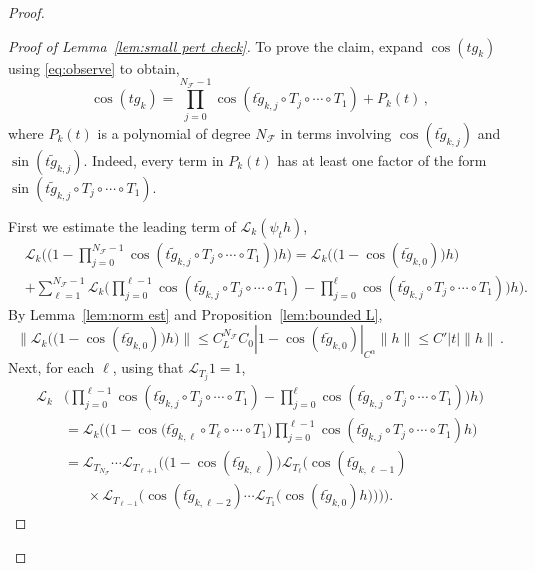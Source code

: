 \documentclass{amsart}
\numberwithin{equation}{section}
\newcommand\cF{{\mathcal F}}
\newcommand\cL{{\mathcal L}}
\begin{document}
\begin{proof}
\begin{proof}[Proof of Lemma~\ref{lem:small pert check}]
To prove the claim, expand $\cos(t g_k)$ using \eqref{eq:observe} to obtain,
\begin{equation}
\label{eq:cos expand}
\cos(t g_k) = \prod_{j=0}^{N_\cF-1} \cos (t \tilde g_{k,j} \circ T_j \circ \cdots \circ T_1) + P_k(t) \, ,
\end{equation} 
where $P_k(t)$ is a polynomial of degree $N_\cF$ in terms involving $\cos(t \tilde g_{k,j})$ and 
$\sin(t \tilde g_{k,j})$.  Indeed, every term in $P_k(t)$ has at least one factor of the form
$\sin(t \tilde g_{k,j} \circ T_j \circ \cdots \circ T_1)$.

First we estimate the leading term of $\cL_k(\psi_t h)$,
\begin{equation}
\label{eq:telescope}
\begin{split}
&\cL_k  \Big( \Big(1 - \prod_{j=0}^{N_\cF-1} \cos (t \tilde g_{k,j} \circ T_j \circ \cdots \circ T_1) \Big)h \Big)
=  \cL_k \big( \big( 1 - \cos(t \tilde g_{k,0}) \big) h \big) \\
& + \sum_{\ell = 1}^{N_\cF-1} \cL_k \Big( \prod_{j=0}^{\ell-1} \cos (t \tilde g_{k,j} \circ T_j \circ \cdots \circ T_1)
- \prod_{j=0}^{\ell} \cos (t \tilde g_{k,j} \circ T_j \circ \cdots \circ T_1) \Big) h \Big)  .
\end{split}
\end{equation}
By Lemma~\ref{lem:norm est} and Proposition~\eqref{lem:bounded L},
\[
\| \cL_k \big( \big( 1 - \cos(t \tilde g_{k,0}) \big) h \big) \| \le C_L^{N_\cF} C_0 |1- \cos(t \tilde g_{k,0})|_{C^\alpha} \| h\|
\le C' |t| \| h \| \, .
\]
Next, for each $\ell$, using that $\cL_{T_j} 1 = 1$, 
\begin{equation}
\label{eq:split L}
\begin{split}
\cL_k & \Big( \prod_{j=0}^{\ell-1} \cos (t \tilde g_{k,j} \circ T_j \circ \cdots \circ T_1)
- \prod_{j=0}^{\ell} \cos (t \tilde g_{k,j} \circ T_j \circ \cdots \circ T_1) \Big) h \Big) \\
& = \cL_k \Big( \big( 1 - \cos(t \tilde g_{k,\ell} \circ T_\ell \circ \cdots \circ T_1 \big) \prod_{j=0}^{\ell-1} \cos (t \tilde g_{k,j} \circ T_j \circ \cdots \circ T_1) h \Big) \\
& = \cL_{T_{N_\cF}} \cdots \cL_{T_{\ell+1} } \Big( \big(1 - \cos(t \tilde g_{k, \ell}) \big) 
\cL_{T_\ell} \big (\cos (t \tilde g_{k,\ell-1})\\
&\phantom{= \;}
\times  \cL_{T_{\ell -1} } \big( \cos(t \tilde g_{k, \ell-2}) \cdots  \cL_{T_1} \big( \cos ( t \tilde g_{k,0}) h \big) \big) \big) \Big).
\end{split}
\end{equation}

\end{proof}
\end{proof}
\end{document}
